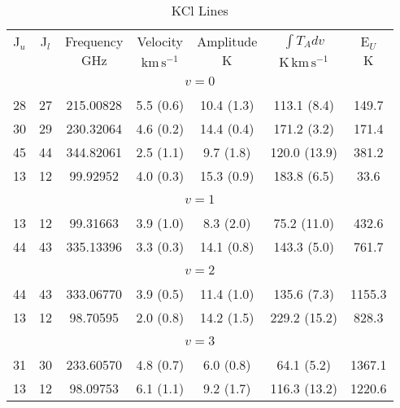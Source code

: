 \begin{table*}[htp]
\centering
\caption{KCl Lines}
\begin{tabular}{ccccccc}
\label{tab:KCl_salt_lines}
 J$_u$ & J$_l$ & Frequency & Velocity & Amplitude & $\int T_A dv$ & E$_U$ \\
  &  & $\mathrm{GHz}$ & $\mathrm{km\,s^{-1}}$ & $\mathrm{K}$ & $\mathrm{K\,km\,s^{-1}}$ & $\mathrm{K}$ \\
\hline
&\vspace{-0.75em}\\
\multicolumn{7}{c}{$v = 0$} \\
\vspace{-0.75em}\\
 28 & 27 & 215.00828 & 5.5 (0.6) & 10.4 (1.3) & 113.1 (8.4) & 149.7 \\
 30 & 29 & 230.32064 & 4.6 (0.2) & 14.4 (0.4) & 171.2 (3.2) & 171.4 \\
 45 & 44 & 344.82061 & 2.5 (1.1) & 9.7 (1.8) & 120.0 (13.9) & 381.2 \\
 13 & 12 & 99.92952 & 4.0 (0.3) & 15.3 (0.9) & 183.8 (6.5) & 33.6 \\
&\vspace{-0.75em}\\
\multicolumn{7}{c}{$v = 1$} \\
\vspace{-0.75em}\\
 13 & 12 & 99.31663 & 3.9 (1.0) & 8.3 (2.0) & 75.2 (11.0) & 432.6 \\
 44 & 43 & 335.13396 & 3.3 (0.3) & 14.1 (0.8) & 143.3 (5.0) & 761.7 \\
&\vspace{-0.75em}\\
\multicolumn{7}{c}{$v = 2$} \\
\vspace{-0.75em}\\
 44 & 43 & 333.06770 & 3.9 (0.5) & 11.4 (1.0) & 135.6 (7.3) & 1155.3 \\
 13 & 12 & 98.70595 & 2.0 (0.8) & 14.2 (1.5) & 229.2 (15.2) & 828.3 \\
&\vspace{-0.75em}\\
\multicolumn{7}{c}{$v = 3$} \\
\vspace{-0.75em}\\
 31 & 30 & 233.60570 & 4.8 (0.7) & 6.0 (0.8) & 64.1 (5.2) & 1367.1 \\
 13 & 12 & 98.09753 & 6.1 (1.1) & 9.2 (1.7) & 116.3 (13.2) & 1220.6 \\

\end{tabular}
\end{table*}
